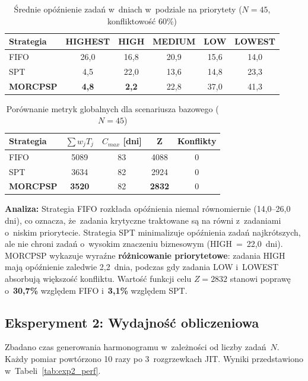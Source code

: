 \begin{table}[H]
\centering
\caption{Średnie opóźnienie zadań w~dniach w~podziale na priorytety ($N=45$, konfliktowość 60\%)}
\label{tab:exp1_tardiness}
\begin{tabular}{|l|c|c|c|c|c|}
\hline
\textbf{Strategia} & \textbf{HIGHEST} & \textbf{HIGH} & \textbf{MEDIUM} & \textbf{LOW} & \textbf{LOWEST} \\ \hline
FIFO & 26{,}0 & 16{,}8 & 20{,}9 & 15{,}6 & 14{,}0 \\ \hline
SPT & 4{,}5 & 22{,}0 & 13{,}6 & 14{,}8 & 23{,}3 \\ \hline
\textbf{MORCPSP} & \textbf{4{,}8} & \textbf{2{,}2} & 22{,}8 & 37{,}0 & 41{,}3 \\ \hline
\end{tabular}
\end{table}

\begin{table}[H]
\centering
\caption{Porównanie metryk globalnych dla scenariusza bazowego ($N=45$)}
\label{tab:exp1_global}
\begin{tabular}{|l|c|c|c|c|}
\hline
\textbf{Strategia} & $\sum w_j T_j$ & $C_{max}$ [dni] & \textbf{Z} & \textbf{Konflikty} \\ \hline
FIFO & 5089 & 83 & 4088 & 0 \\ \hline
SPT & 3634 & 82 & 2924 & 0 \\ \hline
\textbf{MORCPSP} & \textbf{3520} & 82 & \textbf{2832} & 0 \\ \hline
\end{tabular}
\end{table}

\textbf{Analiza:} Strategia FIFO rozkłada opóźnienia niemal równomiernie (14{,}0--26{,}0 dni), co oznacza, że~zadania krytyczne traktowane są na równi z~zadaniami o~niskim priorytecie. Strategia SPT minimalizuje opóźnienia zadań najkrótszych, ale nie chroni zadań o~wysokim znaczeniu biznesowym (HIGH~=~22{,}0~dni). MORCPSP wykazuje wyraźne \textbf{różnicowanie priorytetowe}: zadania HIGH mają opóźnienie zaledwie 2{,}2~dnia, podczas gdy zadania LOW i~LOWEST absorbują większość konfliktu. Wartość funkcji celu $Z = 2832$ stanowi poprawę o~\textbf{30{,}7\%} względem FIFO i~\textbf{3{,}1\%} względem SPT.

\subsection{Eksperyment 2: Wydajność obliczeniowa}
Zbadano czas generowania harmonogramu w~zależności od liczby zadań~$N$. Każdy pomiar powtórzono 10 razy po 3~rozgrzewkach JIT. Wyniki przedstawiono w~Tabeli~\ref{tab:exp2_perf}.

